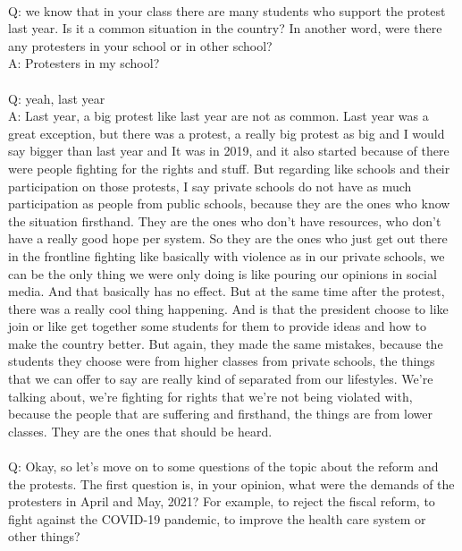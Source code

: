 \documentclass{phyasgn}\usepackage{nag}
\begin{document}
\\
Q: we know that in your class there are many students who support the protest last year. Is it a common situation in the country? In another word, were there any protesters in your school or in other school?\\
A: Protesters in my school?\\
\\
Q: yeah, last year\\
A: Last year, a big protest like last year are not as common. Last year was a great exception, but there was a protest, a really big protest as big and I would say bigger than last year and It was in 2019, and it also started because of there were people fighting for the rights and stuff. But regarding like schools and their participation on those protests, I say private schools do not have as much participation as people from public schools, because they are the ones who know the situation firsthand. They are the ones who don't have resources, who don't have a really good hope per system. So they are the ones who just get out there in the frontline fighting like basically with violence as in our private schools, we can be the only thing we were only doing is like pouring our opinions in social media. And that basically has no effect. But at the same time after the protest, there was a really cool thing happening. And is that the president choose to like join or like get together some students for them to provide ideas and how to make the country better. But again, they made the same mistakes, because the students they choose were from higher classes from private schools, the things that we can offer to say are really kind of separated from our lifestyles. We're talking about, we're fighting for rights that we're not being violated with, because the people that are suffering and firsthand, the things are from lower classes. They are the ones that should be heard.\\
\\
Q: Okay, so let's move on to some questions of the topic about the reform and the protests. The first question is, in your opinion, what were the demands of the protesters in April and May, 2021? For example, to reject the fiscal reform, to fight against the COVID-19 pandemic, to improve the health care system or other things?\\
\end{document}

